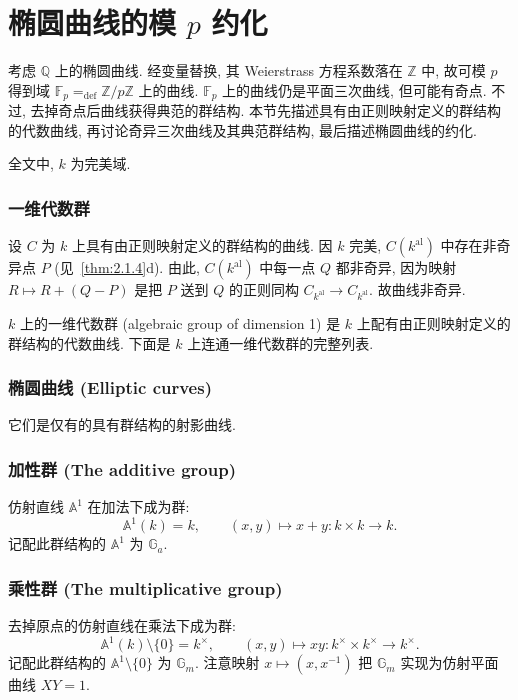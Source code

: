 \section{\texorpdfstring{椭圆曲线的模 $p$ 约化}{椭圆曲线的模 p 约化}}\label{sec:2.3}

考虑 $\mathbb{Q}$ 上的椭圆曲线. 经变量替换, 其 Weierstrass 方程系数落在 $\mathbb{Z}$ 中, 故可模 $p$ 得到域 $\mathbb{F}_p \mathrel{=_{\mathrm{def}}} \mathbb{Z}/p\mathbb{Z}$ 上的曲线. $\mathbb{F}_p$ 上的曲线仍是平面三次曲线, 但可能有奇点. 不过, 去掉奇点后曲线获得典范的群结构. 本节先描述具有由正则映射定义的群结构的代数曲线, 再讨论奇异三次曲线及其典范群结构, 最后描述椭圆曲线的约化.

全文中, $k$ 为完美域.

\subsubsection{一维代数群}

设 $C$ 为 $k$ 上具有由正则映射定义的群结构的曲线. 因 $k$ 完美, $C(k^{\mathrm{al}})$ 中存在非奇异点 $P$ (见~\ref{thm:2.1.4}d). 由此, $C(k^{\mathrm{al}})$ 中每一点 $Q$ 都非奇异, 因为映射 $R\mapsto R + (Q-P)$ 是把 $P$ 送到 $Q$ 的正则同构 $C_{k^{\mathrm{al}}}\to C_{k^{\mathrm{al}}}$. 故曲线非奇异.

$k$ 上的一维代数群 (algebraic group of dimension 1) 是 $k$ 上配有由正则映射定义的群结构的代数曲线. 下面是 $k$ 上连通一维代数群的完整列表.

\subsubsection{椭圆曲线 (Elliptic curves)} 它们是仅有的具有群结构的射影曲线.

\subsubsection{加性群 (The additive group)} 仿射直线 $\mathbb{A}^1$ 在加法下成为群:
\[
\mathbb{A}^1(k) = k, \qquad (x,y)\mapsto x + y\colon k\times k\to k.
\]
记配此群结构的 $\mathbb{A}^1$ 为 $\mathbb{G}_a$.

\subsubsection{乘性群 (The multiplicative group)} 去掉原点的仿射直线在乘法下成为群:
\[
\mathbb{A}^1(k)\setminus\{0\} = k^{\times}, \qquad (x,y)\mapsto xy\colon k^{\times}\times k^{\times}\to k^{\times}.
\]
记配此群结构的 $\mathbb{A}^1\setminus\{0\}$ 为 $\mathbb{G}_m$. 注意映射 $x\mapsto(x, x^{-1})$ 把 $\mathbb{G}_m$ 实现为仿射平面曲线 $XY = 1$.

